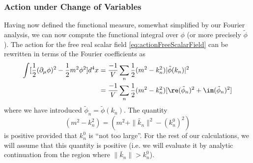 \subsubsection{Action under Change of Variables} Having now
defined the functional measure, somewhat simplified by our
Fourier analysis, we can now compute the functional integral over
$\phi$ (or more precisely $\tilde{\phi}$). The action for the
free real scalar field \eqref{eq:actionFreeScalarField} can be
rewritten in terms of the Fourier coefficients as
\begin{subequations}
\begin{align}
\int[\frac{1}{2}(\partial_{\mu}\phi)^{2}-\frac{1}{2}m^{2}\phi^{2}]d^{4}x 
&=
\frac{-1}{V}\sum_{n}\frac{1}{2}(m^{2}-k_{n}^{2})|\tilde{\phi}(k_{n})|^{2}\\
&= 
\frac{-1}{V}\sum_{n}\frac{1}{2}(m^{2}-k_{n}^{2})[\re(\tilde{\phi}_{n})^{2}+\im(\tilde{\phi}_{n})^{2}]
\end{align}
\end{subequations}
where we have introduced
$\tilde{\phi}_{n}=\widetilde{\phi}(k_{n})$. The quantity
\begin{equation}%
(m^{2}-k_{n}^{2}) = (m^{2}+\|\bar{k}_{n}\|^{2}-(k_{n}^{0})^{2})
\end{equation}
is positive provided that $k^{0}_{n}$ is ``not too large''. For
the rest of our calculations, we will assume that this quantity
is positive (i.e. we will evaluate it by analytic continuation
from the region where $\|\bar{k}_{n}\|>k^{0}_{n}$).

